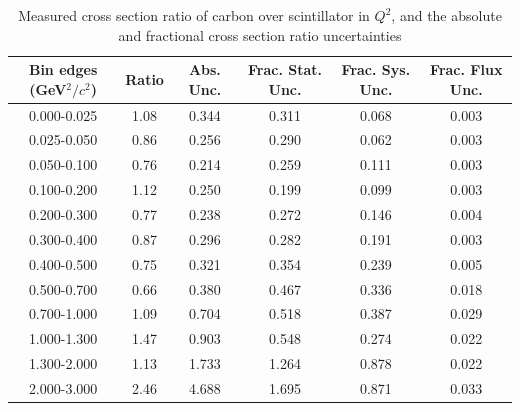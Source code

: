 \documentclass[../main.tex]{subfiles}
\begin{document}
\begin{table}
  \centering
  \renewcommand{\arraystretch}{1.15}
  \caption{Measured cross section ratio of carbon over scintillator in $Q^2$, and the absolute and fractional cross section ratio uncertainties}
    \begin{tabular}{c||c|c||c|c|c}
      Bin edges (GeV${}^2/c{}^2$) &  Ratio  &  Abs. Unc.  &  Frac. Stat. Unc.  &  Frac. Sys. Unc.  &  Frac. Flux Unc. \\
      \hline
      \hline
      0.000-0.025 & 1.08 & 0.344 & 0.311 & 0.068 & 0.003\\
      0.025-0.050 & 0.86 & 0.256 & 0.290 & 0.062 & 0.003\\
      0.050-0.100 & 0.76 & 0.214 & 0.259 & 0.111 & 0.003\\
      0.100-0.200 & 1.12 & 0.250 & 0.199 & 0.099 & 0.003\\
      0.200-0.300 & 0.77 & 0.238 & 0.272 & 0.146 & 0.004\\
      0.300-0.400 & 0.87 & 0.296 & 0.282 & 0.191 & 0.003\\
      0.400-0.500 & 0.75 & 0.321 & 0.354 & 0.239 & 0.005\\
      0.500-0.700 & 0.66 & 0.380 & 0.467 & 0.336 & 0.018\\
      0.700-1.000 & 1.09 & 0.704 & 0.518 & 0.387 & 0.029\\
      1.000-1.300 & 1.47 & 0.903 & 0.548 & 0.274 & 0.022\\
      1.300-2.000 & 1.13 & 1.733 & 1.264 & 0.878 & 0.022\\
      2.000-3.000 & 2.46 & 4.688 & 1.695 & 0.871 & 0.033
    \end{tabular}
  \label{tbl:rationucleonnuc6q2a}
\end{table}
\pagebreak
\end{document}
